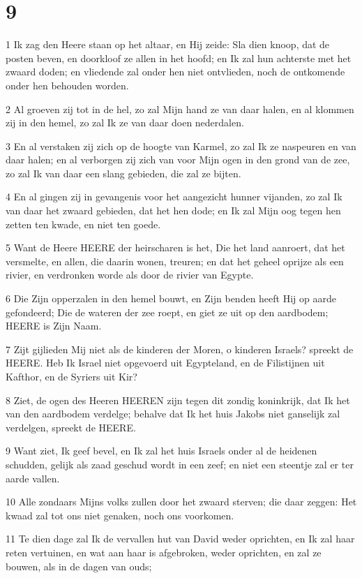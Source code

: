 \chapter{9}

\par 1 Ik zag den Heere staan op het altaar, en Hij zeide: Sla dien knoop, dat de posten beven, en doorkloof ze allen in het hoofd; en Ik zal hun achterste met het zwaard doden; en vliedende zal onder hen niet ontvlieden, noch de ontkomende onder hen behouden worden.
\par 2 Al groeven zij tot in de hel, zo zal Mijn hand ze van daar halen, en al klommen zij in den hemel, zo zal Ik ze van daar doen nederdalen.
\par 3 En al verstaken zij zich op de hoogte van Karmel, zo zal Ik ze naspeuren en van daar halen; en al verborgen zij zich van voor Mijn ogen in den grond van de zee, zo zal Ik van daar een slang gebieden, die zal ze bijten.
\par 4 En al gingen zij in gevangenis voor het aangezicht hunner vijanden, zo zal Ik van daar het zwaard gebieden, dat het hen dode; en Ik zal Mijn oog tegen hen zetten ten kwade, en niet ten goede.
\par 5 Want de Heere HEERE der heirscharen is het, Die het land aanroert, dat het versmelte, en allen, die daarin wonen, treuren; en dat het geheel oprijze als een rivier, en verdronken worde als door de rivier van Egypte.
\par 6 Die Zijn opperzalen in den hemel bouwt, en Zijn benden heeft Hij op aarde gefondeerd; Die de wateren der zee roept, en giet ze uit op den aardbodem; HEERE is Zijn Naam.
\par 7 Zijt gijlieden Mij niet als de kinderen der Moren, o kinderen Israels? spreekt de HEERE. Heb Ik Israel niet opgevoerd uit Egypteland, en de Filistijnen uit Kafthor, en de Syriers uit Kir?
\par 8 Ziet, de ogen des Heeren HEEREN zijn tegen dit zondig koninkrijk, dat Ik het van den aardbodem verdelge; behalve dat Ik het huis Jakobs niet ganselijk zal verdelgen, spreekt de HEERE.
\par 9 Want ziet, Ik geef bevel, en Ik zal het huis Israels onder al de heidenen schudden, gelijk als zaad geschud wordt in een zeef; en niet een steentje zal er ter aarde vallen.
\par 10 Alle zondaars Mijns volks zullen door het zwaard sterven; die daar zeggen: Het kwaad zal tot ons niet genaken, noch ons voorkomen.
\par 11 Te dien dage zal Ik de vervallen hut van David weder oprichten, en Ik zal haar reten vertuinen, en wat aan haar is afgebroken, weder oprichten, en zal ze bouwen, als in de dagen van ouds;

